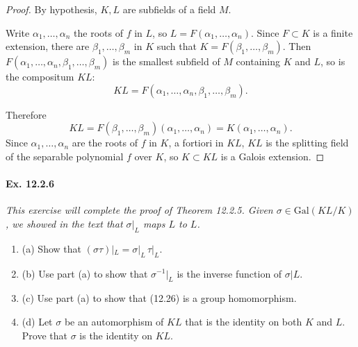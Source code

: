 \documentclass[11pt,a4paper]{article}
\newcommand{\be} {\begin{enumerate}}
\newcommand{\ee} {\end{enumerate}}
\newcommand{\Gal}{\mathrm{Gal}}
\begin{document}
\begin{proof}
By hypothesis, $K,L$ are subfields of a field $M$.

Write $\alpha_1,\ldots,\alpha_n$ the roots of $f$ in $L$, so $L = F(\alpha_1,\ldots,\alpha_n)$.
Since $F\subset K$ is a finite extension, there are $\beta_1,\ldots,\beta_m$ in $K$ such that $K = F(\beta_1,\ldots,\beta_m)$. Then $F(\alpha_1,\ldots,\alpha_n,\beta_1,\ldots,\beta_m)$ is the smallest subfield of $M$ containing $K$ and $L$, so is the compositum $KL$:
$$KL = F(\alpha_1,\ldots,\alpha_n,\beta_1,\ldots,\beta_m).$$

Therefore $$KL = F(\beta_1,\ldots,\beta_m)(\alpha_1,\ldots,\alpha_n) = K(\alpha_1,\ldots,\alpha_n).$$
Since $\alpha_1,\ldots,\alpha_n$ are the roots of $f$ in $K$, a fortiori in $KL$,  $KL$ is the splitting field of the separable polynomial $f$ over $ K$, so $K\subset KL$ is a Galois extension.
\end{proof}

\paragraph{Ex. 12.2.6}

{\it This exercise will complete the proof of Theorem 12.2.5. Given $\sigma \in \Gal(KL/K)$, we showed in the text that $\sigma|_L$ maps $L$ to $L$.
\be
\item[(a)] Show that $(\sigma \tau)|_L = \sigma|_L\, \tau|_L$.
\item[(b)] Use part (a) to show that $\sigma^{-1}|_L$ is the inverse function of $\sigma|L$.
\item[(c)] Use part (a) to show that (12.26) is a group homomorphism.
\item[(d)] Let $\sigma$ be an automorphism of $KL$ that is the identity on both $K$ and $L$. Prove that $\sigma$ is the identity on $KL$.
\ee
}
\end{document}
